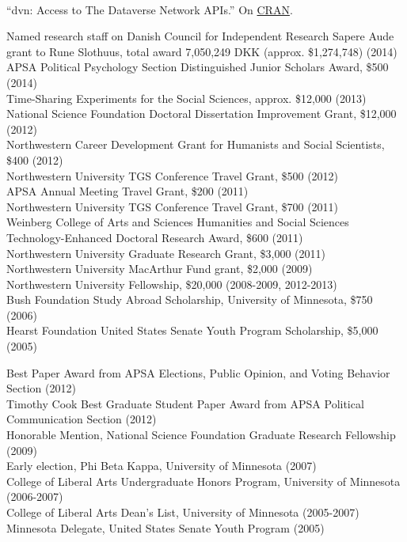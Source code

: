 \documentclass[12pt]{article}
\renewcommand{\section}[1]{\pagebreak[3]%
    \llap{\scshape\smash{\parbox[t]{\marginparwidth}{\raggedright {\color{lg}#1}}}}%
    \vspace{-\baselineskip}\par}
\newcommand{\topic}[1]{\pagebreak[3]\indent {\color{lg}{\footnotesize #1 }}\\}
\newcommand{\entry}[1]{\indent {\color{lg}\guillemotright}\hspace{2pt}#1\vspace{.25em}\\}
\begin{document}
\topic{R packages contributed to rOpenSci}
\entry{``dvn: Access to The Dataverse Network APIs.'' On \href{http://cran.r-project.org/web/packages/dvn/index.html}{CRAN}.}


\section{Grants\\and\\Funding}
\entry{Named research staff on Danish Council for Independent Research Sapere Aude grant to Rune Slothuus, total award 7,050,249 DKK (approx. \$1,274,748) (2014)}
\entry{APSA Political Psychology Section Distinguished Junior Scholars Award, \$500 (2014)}
\entry{Time-Sharing Experiments for the Social Sciences, approx. \$12,000 (2013)}
\entry{National Science Foundation Doctoral Dissertation Improvement Grant, \$12,000 (2012)}
\entry{Northwestern Career Development Grant for Humanists and Social Scientists, \$400 (2012)}
\entry{Northwestern University TGS Conference Travel Grant, \$500 (2012)}
\entry{APSA Annual Meeting Travel Grant, \$200 (2011)}
\entry{Northwestern University TGS Conference Travel Grant, \$700 (2011)}
\entry{Weinberg College of Arts and Sciences Humanities and Social Sciences Technology-Enhanced Doctoral Research Award, \$600 (2011)}
\entry{Northwestern University Graduate Research Grant, \$3,000 (2011)}
\entry{Northwestern University MacArthur Fund grant, \$2,000 (2009)}
\entry{Northwestern University Fellowship, \$20,000 (2008-2009, 2012-2013)}
\entry{Bush Foundation Study Abroad Scholarship, University of Minnesota, \$750 (2006)}
\entry{Hearst Foundation United States Senate Youth Program Scholarship, \$5,000 (2005)}

\section{Honors\\and\\Awards}
\entry{Best Paper Award from APSA Elections, Public Opinion, and Voting Behavior Section (2012)}
\entry{Timothy Cook Best Graduate Student Paper Award from APSA Political Communication Section (2012)}
\entry{Honorable Mention, National Science Foundation Graduate Research Fellowship (2009)}
\entry{Early election, Phi Beta Kappa, University of Minnesota (2007)}
\entry{College of Liberal Arts Undergraduate Honors Program, University of Minnesota (2006-2007)}
\entry{College of Liberal Arts Dean's List, University of Minnesota (2005-2007)}
\entry{Minnesota Delegate, United States Senate Youth Program (2005)}
\end{document}
